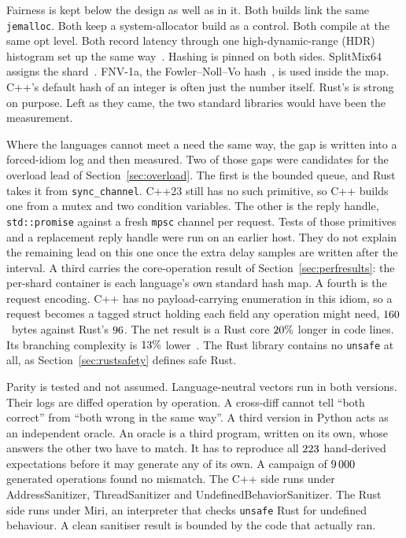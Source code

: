 \documentclass[english,oneside,a4paper,censored,csm,software-track-2020]{HYthesisML}
\begin{document}
Fairness is kept below the design as well as in it. Both builds link the same
\texttt{jemalloc}. Both keep a system-allocator build as a control. Both
compile at the same opt level. Both record latency through one high-dynamic-range
(HDR) histogram set up the same way~\cite{tene_hdrhistogram}. Hashing is pinned
on both sides. SplitMix64 assigns the shard~\cite{steele2014splitmix}. FNV-1a, the
Fowler--Noll--Vo hash~\cite{rfc9923}, is used inside the map. C++'s default hash of an
integer is often just the number itself. Rust's is strong on purpose. Left as they came,
the two standard libraries would have been the measurement.

Where the languages cannot meet a need the same way, the gap is written into a
forced-idiom log and then measured. Two of those gaps were candidates for the
overload lead of Section~\ref{sec:overload}. The first is the bounded queue, and Rust takes it
from \texttt{sync\_channel}. C++23 still has no such primitive, so C++ builds
one from a mutex and two condition variables. The other is the reply handle,
\texttt{std::promise} against a fresh \texttt{mpsc} channel per request. Tests
of those primitives and a replacement reply handle were run on an earlier
host. They do not explain the remaining lead on this one once the
extra delay samples are written after the interval. A
third carries the core-operation result of Section~\ref{sec:perfresults}: the
per-shard container is each language's own standard hash map. A fourth is the
request encoding. C++ has no payload-carrying enumeration in this idiom, so a
request becomes a tagged struct holding each field any operation might need,
$160$~bytes against Rust's $96$. The net result is
a Rust core $20\%$ longer in code lines. Its branching complexity is
$13\%$ lower~\cite{lizard}. The Rust library contains no
\texttt{unsafe} at all, as Section~\ref{sec:rustsafety} defines safe Rust.

Parity is tested and not assumed. Language-neutral vectors run in both
versions. Their logs are diffed operation by operation. A cross-diff cannot tell ``both
correct'' from ``both wrong in the same way''. A third version in Python acts
as an independent oracle. An
oracle is a third program, written on its own, whose answers the other two have to match.
It has to reproduce all $223$ hand-derived
expectations before it may generate any of its own. A campaign of
$9\,000$ generated operations found no mismatch. The C++ side runs under
AddressSanitizer, ThreadSanitizer and UndefinedBehaviorSanitizer. The Rust
side runs under Miri, an interpreter that checks \texttt{unsafe} Rust for
undefined behaviour. A clean sanitiser result is bounded by the code that
actually ran.
\end{document}
